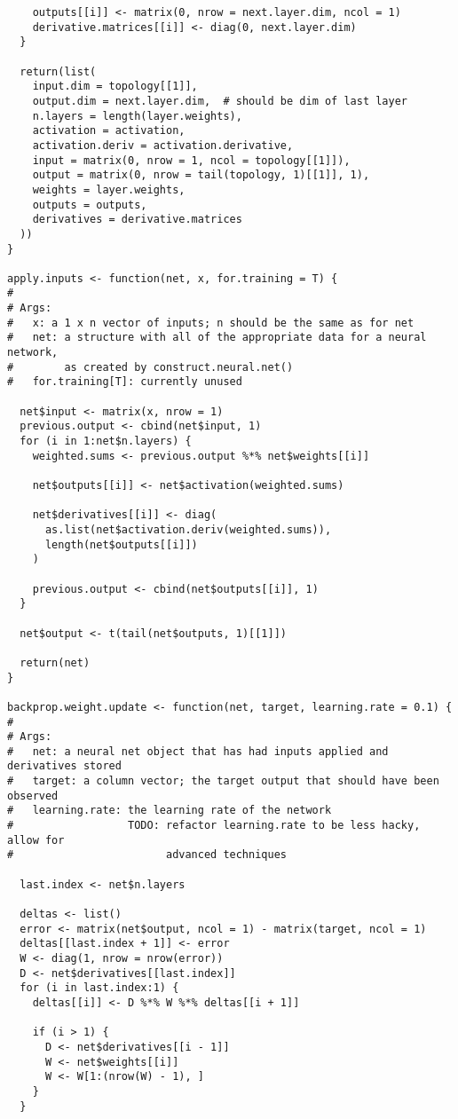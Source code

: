 \documentclass{article}
\begin{document}
\begin{verbatim}
    outputs[[i]] <- matrix(0, nrow = next.layer.dim, ncol = 1)
    derivative.matrices[[i]] <- diag(0, next.layer.dim)
  }

  return(list(
    input.dim = topology[[1]],
    output.dim = next.layer.dim,  # should be dim of last layer
    n.layers = length(layer.weights),
    activation = activation,
    activation.deriv = activation.derivative,
    input = matrix(0, nrow = 1, ncol = topology[[1]]),
    output = matrix(0, nrow = tail(topology, 1)[[1]], 1),
    weights = layer.weights,
    outputs = outputs,
    derivatives = derivative.matrices
  ))
}

apply.inputs <- function(net, x, for.training = T) {
#
# Args:
#   x: a 1 x n vector of inputs; n should be the same as for net
#   net: a structure with all of the appropriate data for a neural network,
#        as created by construct.neural.net()
#   for.training[T]: currently unused

  net$input <- matrix(x, nrow = 1)
  previous.output <- cbind(net$input, 1)
  for (i in 1:net$n.layers) {
    weighted.sums <- previous.output %*% net$weights[[i]]

    net$outputs[[i]] <- net$activation(weighted.sums)

    net$derivatives[[i]] <- diag(
      as.list(net$activation.deriv(weighted.sums)),
      length(net$outputs[[i]])
    )

    previous.output <- cbind(net$outputs[[i]], 1)
  }

  net$output <- t(tail(net$outputs, 1)[[1]])

  return(net)
}

backprop.weight.update <- function(net, target, learning.rate = 0.1) {
#
# Args:
#   net: a neural net object that has had inputs applied and derivatives stored
#   target: a column vector; the target output that should have been observed
#   learning.rate: the learning rate of the network
#                  TODO: refactor learning.rate to be less hacky, allow for
#                        advanced techniques

  last.index <- net$n.layers

  deltas <- list()
  error <- matrix(net$output, ncol = 1) - matrix(target, ncol = 1)
  deltas[[last.index + 1]] <- error
  W <- diag(1, nrow = nrow(error))
  D <- net$derivatives[[last.index]]
  for (i in last.index:1) {
    deltas[[i]] <- D %*% W %*% deltas[[i + 1]]

    if (i > 1) {
      D <- net$derivatives[[i - 1]]
      W <- net$weights[[i]]
      W <- W[1:(nrow(W) - 1), ]
    }
  }


\end{verbatim}
\end{document}
